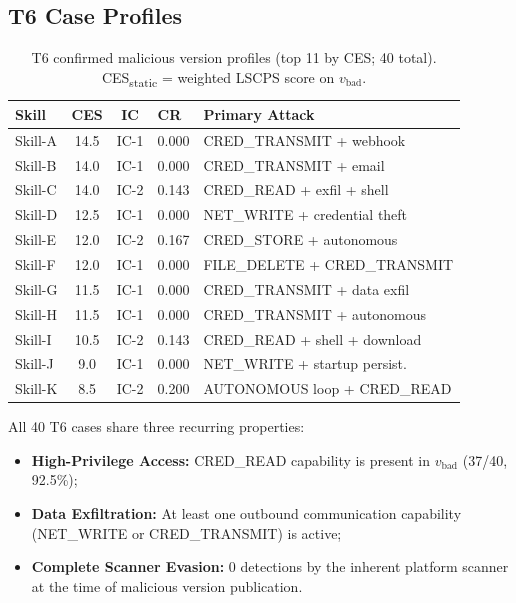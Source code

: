 \subsection{T6 Case Profiles}

\begin{table}[h]
\centering
\caption{T6 confirmed malicious version profiles (top 11 by CES; 40 total).%
  CES\textsubscript{static} = weighted LSCPS score on $v_{\text{bad}}$.}
\label{tab:t6cases}
\scriptsize
\begin{tabular}{@{}lcclp{3.3cm}@{}}
\toprule
\textbf{Skill} & \textbf{CES} & \textbf{IC} & \textbf{CR} & \textbf{Primary Attack} \\
\midrule
Skill-A  & 14.5 & IC-1 & 0.000 & CRED\_TRANSMIT + webhook \\
Skill-B  & 14.0 & IC-1 & 0.000 & CRED\_TRANSMIT + email \\
Skill-C  & 14.0 & IC-2 & 0.143 & CRED\_READ + exfil + shell \\
Skill-D  & 12.5 & IC-1 & 0.000 & NET\_WRITE + credential theft \\
Skill-E  & 12.0 & IC-2 & 0.167 & CRED\_STORE + autonomous \\
Skill-F  & 12.0 & IC-1 & 0.000 & FILE\_DELETE + CRED\_TRANSMIT \\
Skill-G  & 11.5 & IC-1 & 0.000 & CRED\_TRANSMIT + data exfil \\
Skill-H  & 11.5 & IC-1 & 0.000 & CRED\_TRANSMIT + autonomous \\
Skill-I  & 10.5 & IC-2 & 0.143 & CRED\_READ + shell + download \\
Skill-J  & 9.0  & IC-1 & 0.000 & NET\_WRITE + startup persist. \\
Skill-K  & 8.5  & IC-2 & 0.200 & AUTONOMOUS loop + CRED\_READ \\
\bottomrule
\end{tabular}
\end{table}

All 40 T6 cases share three recurring properties:
\begin{itemize}
    \item \textbf{High-Privilege Access:} CRED\_READ capability is present in $v_{\text{bad}}$ (37/40, 92.5\%);
    \item \textbf{Data Exfiltration:} At least one outbound communication capability (NET\_WRITE or CRED\_TRANSMIT) is active;
    \item \textbf{Complete Scanner Evasion:} 0 detections by the inherent platform scanner at the time of malicious version publication.
\end{itemize}

